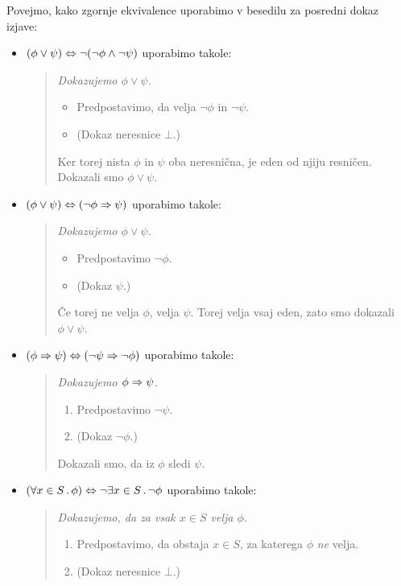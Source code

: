 Povejmo, kako zgornje ekvivalence uporabimo v besedilu za posredni
dokaz izjave:
%
\begin{itemize}
\item $(\phi \lor \psi) \Leftrightarrow \lnot (\lnot\phi \land \lnot\psi)$
  uporabimo takole:
  \begin{quote}
    \it
    Dokazujemo $\phi \lor \psi$.
    \begin{itemize}
    \item[] Predpostavimo, da velja $\lnot\phi$ in $\lnot\psi$.
    \item[] (Dokaz neresnice $\bot$.)
    \end{itemize}
    Ker torej nista $\phi$ in $\psi$ oba neresnična, je eden od njiju
    resničen. Dokazali smo $\phi \lor \psi$.
  \end{quote}
\item $(\phi \lor \psi) \Leftrightarrow (\lnot\phi \Rightarrow \psi)$ uporabimo
  takole:
  \begin{quote}
    \it
    Dokazujemo $\phi \lor \psi$.
    \begin{itemize}
    \item[] Predpostavimo $\lnot\phi$.
    \item[] (Dokaz $\psi$.)
    \end{itemize}
    Če torej ne velja $\phi$, velja $\psi$. Torej velja vsaj
    eden, zato smo dokazali $\phi \lor \psi$.
  \end{quote}
\item $(\phi \Rightarrow \psi) \Leftrightarrow (\lnot\psi \Rightarrow \lnot\phi)$
  uporabimo takole:
  \begin{quote}
    \it
    Dokazujemo $\phi \Rightarrow \psi$.
    \begin{enumerate}
    \item Predpostavimo $\lnot\psi$.
    \item (Dokaz $\lnot\phi$.)
    \end{enumerate}
    Dokazali smo, da iz $\phi$ sledi $\psi$.
  \end{quote}
\item $(\forall x \in S \,.\, \phi) \Leftrightarrow \lnot \exists x \in S \,.\, \lnot \phi$
  uporabimo takole:
  \begin{quote}
    \it
    Dokazujemo, da za vsak $x \in S$ velja $\phi$.
    \begin{enumerate}
    \item Predpostavimo, da obstaja $x \in S$, za katerega $\phi$
      \emph{ne} velja.
    \item (Dokaz neresnice $\bot$.)

\end{enumerate}
\end{quote}
\end{itemize}
